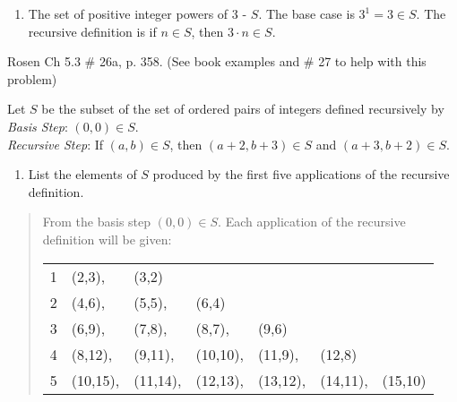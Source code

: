\documentclass[12pt,addpoints]{exam}
\begin{document}
\begin{questions}
\begin{solution}
\begin{enumerate}[label=(\alph*),itemsep=0pt,parsep=0pt,topsep=0pt]
    \item The set of positive integer powers of 3 - $S$.  The base case is $3^1 = 3 \in S$.  The recursive definition is if $n \in S$, then $3\cdot n \in S$.
\end{enumerate}
\end{solution}


\question[6] Rosen Ch 5.3 \# 26a, p. 358. (See book examples and \#
27 to help with this problem)
\begin{solution}
Let $S$ be the subset of the set of ordered pairs of integers defined recursively by \\
\textit{Basis Step}: $(0,0) \in S$. \\
\textit{Recursive Step}: If $(a,b) \in S$, then $(a+2,b+3)\in S$ and $(a+3,b+2) \in S$. \\
\begin{enumerate}
    \item List the elements of $S$ produced by the first five applications of the recursive definition.
\end{enumerate}
\begin{quote}
    From the basis step $(0,0) \in S$.  Each application of the recursive definition will be given:

    \begin{tabular}{rllllll}
    1 & (2,3), & (3,2) \\
    2 & (4,6), & (5,5), & (6,4) \\
    3 & (6,9), & (7,8), & (8,7), & (9,6) \\
    4 & (8,12), & (9,11), & (10,10), & (11,9), & (12,8) \\
    5 & (10,15), & (11,14), & (12,13), & (13,12), & (14,11), & (15,10) \\
    \end{tabular}
\end{quote}
\end{solution}

\end{questions}
\end{document}
